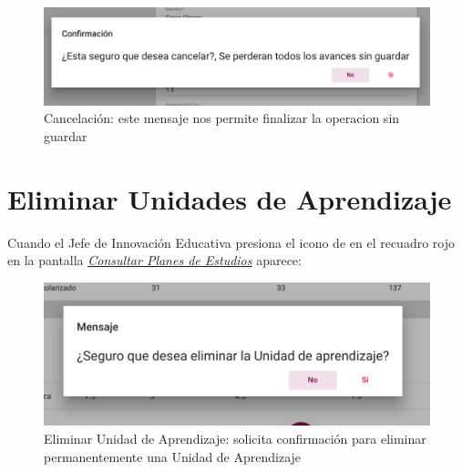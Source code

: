 \begin{figure}[!hbtp]
    \centering
    \hypertarget{cancelarE}{\includegraphics[width=0.7\linewidth]{images/GUA/cancelar}}
    \caption{Cancelación: este mensaje nos permite finalizar la operacion sin guardar}
    \label{cancelarE}
\end{figure}
\newpage
\section{Eliminar Unidades de Aprendizaje}
Cuando el Jefe de Innovación Educativa presiona el icono de  en el recuadro rojo en la pantalla \hyperlink{consultarUA}{\textit{Consultar Planes de Estudios}} aparece:\\
\begin{figure}[!hbtp]
    \centering
    \hypertarget{EliminarUA}{\includegraphics[width=0.7\linewidth]{images/GUA/EliminarUA}}
    \caption{Eliminar Unidad de Aprendizaje: solicita confirmación para eliminar permanentemente una Unidad de Aprendizaje}
    \label{EliminarUA}
\end{figure}